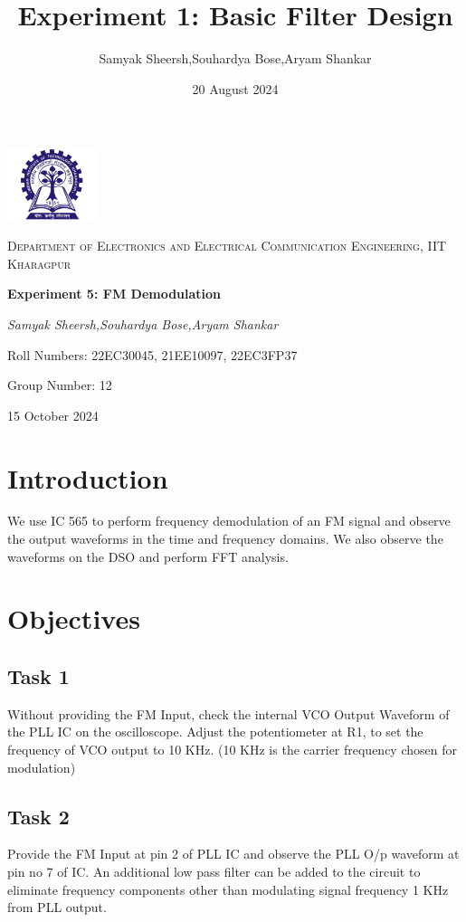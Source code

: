 \documentclass{article}
\title{Experiment 1: Basic Filter Design}
\author{Samyak Sheersh,Souhardya Bose,Aryam Shankar}
\date{20 August 2024}
\begin{document}
\begin{titlepage}
    \centering
    \includegraphics[width=0.2\textwidth]{KGP_logo.png}\par\vspace{1cm}
    {\scshape\LARGE Department of Electronics and Electrical Communication Engineering, IIT Kharagpur\par}
    \vspace{1cm}
    {\huge\bfseries Experiment 5: FM Demodulation\par}
    \vspace{1.5cm}
    {\Large\itshape Samyak Sheersh,Souhardya Bose,Aryam Shankar\par}
    \vfill
    {\large Roll Numbers: 22EC30045, 21EE10097, 22EC3FP37\par}
    {\large Group Number: 12\par}
    \vfill
    {\large 15 October 2024\par}
\end{titlepage}


\section{Introduction}
We use IC 565 to perform frequency demodulation of an FM signal and observe the output waveforms in the time and frequency domains. We also observe the waveforms on the DSO and perform FFT analysis.
\section{Objectives}
\subsection{Task 1}
Without providing the FM Input, check the internal VCO Output Waveform of the PLL IC on the oscilloscope. Adjust the potentiometer at R1, to set the frequency of VCO output to 10 KHz. (10 KHz is the carrier frequency chosen for modulation)
\subsection{Task 2}
Provide the FM Input at pin 2 of PLL IC and observe the PLL O/p waveform at pin no 7 of IC. An additional low pass filter can be added to the circuit to eliminate frequency components other than modulating signal frequency 1 KHz from PLL output.
\end{document}
